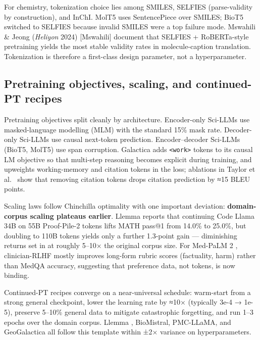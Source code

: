 \documentclass{article}
\begin{document}
For chemistry, tokenization choice lies among SMILES, SELFIES (parse-validity by construction), and InChI. MolT5 \cite{edwards2022emnlp2022} uses SentencePiece over SMILES; BioT5 \cite{pei2023emnlp2023} switched to SELFIES because invalid SMILES were a top failure mode. Mswahili \& Jeong (\emph{Heliyon} 2024) {[}Mswahili{]} document that SELFIES + RoBERTa-style pretraining yields the most stable validity rates in molecule-caption translation. Tokenization is therefore a first-class design parameter, not a hyperparameter.

\subsection{Pretraining objectives, scaling, and continued-PT recipes}\label{pretraining-objectives-scaling-and-continued-pt-recipes}

Pretraining objectives split cleanly by architecture. Encoder-only Sci-LLMs use masked-language modelling (MLM) with the standard 15\% mask rate. Decoder-only Sci-LLMs use causal next-token prediction. Encoder--decoder Sci-LLMs (BioT5, MolT5) use span corruption. Galactica adds \texttt{\textless{}work\textgreater{}} tokens to its causal LM objective so that multi-step reasoning becomes explicit during training, and upweights working-memory and citation tokens in the loss; ablations in Taylor et al.~\cite{taylor2022arxiv2211090852022} show that removing citation tokens drops citation prediction by ≈15 BLEU points.

Scaling laws follow Chinchilla optimality with one important deviation: \textbf{domain-corpus scaling plateaus earlier}. Llemma \cite{azerbayev2023llemmaanopenlangua} reports that continuing Code Llama 34B on 55B Proof-Pile-2 tokens lifts MATH pass@1 from 14.0\% to 25.0\%, but doubling to 110B tokens yields only a further 1.3-point gain --- diminishing returns set in at roughly 5--10× the original corpus size. For Med-PaLM 2 \cite{singhal2025towardexpertlevelm}, clinician-RLHF mostly improves long-form rubric scores (factuality, harm) rather than MedQA accuracy, suggesting that preference data, not tokens, is now binding.

Continued-PT recipes converge on a near-universal schedule: warm-start from a strong general checkpoint, lower the learning rate by ≈10× (typically 3e-4 → 1e-5), preserve 5--10\% general data to mitigate catastrophic forgetting, and run 1--3 epochs over the domain corpus. Llemma \cite{azerbayev2023llemmaanopenlangua}, BioMistral, PMC-LLaMA, and GeoGalactica \cite{lin2023geogalacticaascien} all follow this template within ±2× variance on hyperparameters.
\end{document}
